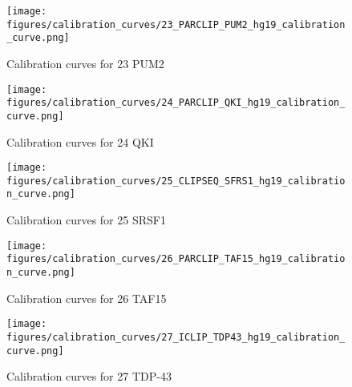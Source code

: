 \documentclass[11pt]{article}
\begin{document}
    
    
    \begin{figure}
        \begin{center}
            \texttt{[image: figures/calibration\_curves/23\_PARCLIP\_PUM2\_hg19\_calibration\_curve.png]}
            \caption{Calibration curves for 23 PUM2}
            \label{fig:calibration23 PUM2}
        \end{center}
    \end{figure}

    
    
    \begin{figure}
        \begin{center}
            \texttt{[image: figures/calibration\_curves/24\_PARCLIP\_QKI\_hg19\_calibration\_curve.png]}
            \caption{Calibration curves for 24 QKI}
            \label{fig:calibration24 QKI}
        \end{center}
    \end{figure}

    
    
    \begin{figure}
        \begin{center}
            \texttt{[image: figures/calibration\_curves/25\_CLIPSEQ\_SFRS1\_hg19\_calibration\_curve.png]}
            \caption{Calibration curves for 25 SRSF1}
            \label{fig:calibration25 SRSF1}
        \end{center}
    \end{figure}

    
    
    \begin{figure}
        \begin{center}
            \texttt{[image: figures/calibration\_curves/26\_PARCLIP\_TAF15\_hg19\_calibration\_curve.png]}
            \caption{Calibration curves for 26 TAF15}
            \label{fig:calibration26 TAF15}
        \end{center}
    \end{figure}

    
    
    \begin{figure}
        \begin{center}
            \texttt{[image: figures/calibration\_curves/27\_ICLIP\_TDP43\_hg19\_calibration\_curve.png]}
            \caption{Calibration curves for 27 TDP-43}
            \label{fig:calibration27 TDP-43}
        \end{center}
    \end{figure}
\end{document}

